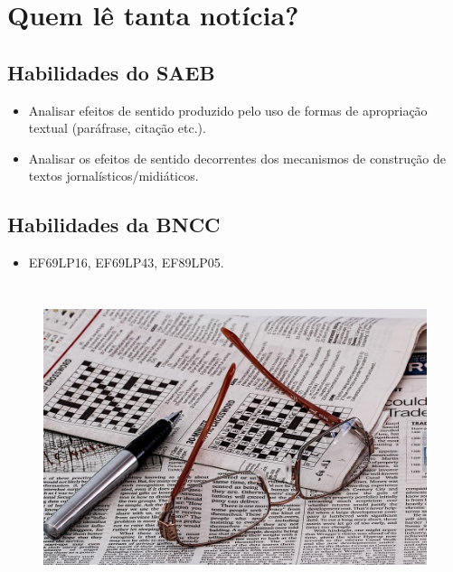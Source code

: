 \chapter{Quem lê tanta notícia?}

\section{Habilidades do SAEB}

\begin{itemize}
\item
  Analisar efeitos de sentido produzido pelo uso de formas de
  apropriação textual (paráfrase, citação etc.).
\item
  Analisar os efeitos de sentido decorrentes dos mecanismos de
  construção de textos jornalísticos/midiáticos.
\end{itemize}

\section{Habilidades da BNCC}

\begin{itemize}
\item EF69LP16, EF69LP43, EF89LP05.
\end{itemize}


\begin{figure}
\centering
\includegraphics[width=5.27083in,height=3.51368in]{./_SAEB_9_POR/media/image6.jpeg}
\end{figure}

